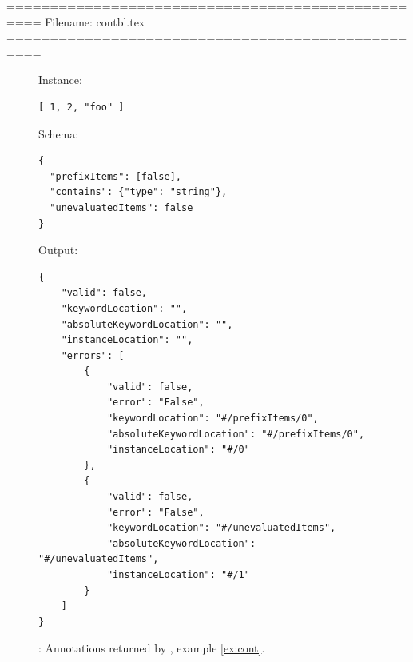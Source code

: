 ==================================================
Filename: contbl.tex
==================================================
\begin{figure}
\small

Instance:
\begin{querybox}{}
\begin{lstlisting}[style=querynonumbers]
[ 1, 2, "foo" ]
\end{lstlisting}
\end{querybox}


Schema:
\begin{querybox}{}
\begin{lstlisting}[style=query]
{
  "prefixItems": [false],
  "contains": {"type": "string"},
  "unevaluatedItems": false
}
\end{lstlisting}
\end{querybox}

Output:
\begin{querybox}{}
\begin{lstlisting}[style=query]
{
	"valid": false,
	"keywordLocation": "",
	"absoluteKeywordLocation": "",
	"instanceLocation": "",
	"errors": [
		{
			"valid": false,
			"error": "False",
			"keywordLocation": "#/prefixItems/0",
			"absoluteKeywordLocation": "#/prefixItems/0",
			"instanceLocation": "#/0"
		},
		{
			"valid": false,
			"error": "False",
			"keywordLocation": "#/unevaluatedItems",
			"absoluteKeywordLocation": "#/unevaluatedItems",
			"instanceLocation": "#/1"
		}
	]
}
\end{lstlisting}
\end{querybox}

\caption{{\qcont}: Annotations returned by {\BL}, example \ref{ex:cont}.}
\label{fig:contbl}
\end{figure}



